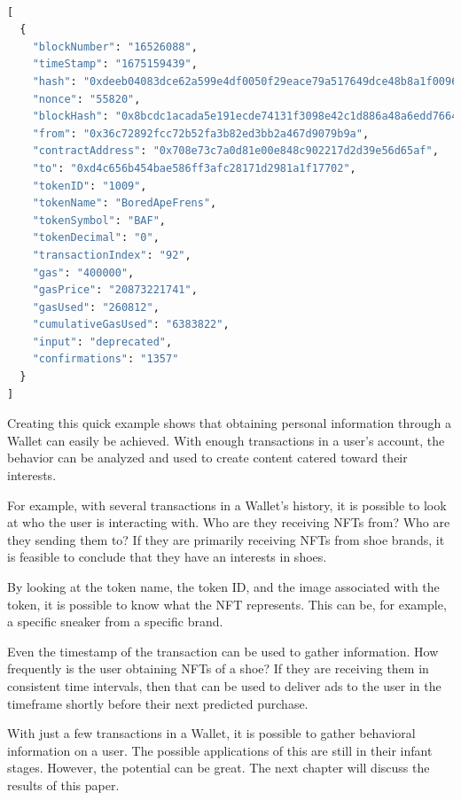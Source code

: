 \begin{center}
\begin{lstlisting}[label=lst:apiResult ,language=python, caption={A real-world example of the response to the API request from listing \ref{lst:apiCall}. The result contains a variety of information, such as the transaction timestamp, the sender's public address (from), and the receivers public address (to). The response is provided by the \textit{Etherscan} API \cite{etherscan}.}, captionpos=b]

[
  {
    "blockNumber": "16526088",
    "timeStamp": "1675159439",
    "hash": "0xdeeb04083dce62a599e4df0050f29eace79a517649dce48b8a1f00961f39742c",
    "nonce": "55820",
    "blockHash": "0x8bcdc1acada5e191ecde74131f3098e42c1d886a48a6edd766425c725d976455",
    "from": "0x36c72892fcc72b52fa3b82ed3bb2a467d9079b9a",
    "contractAddress": "0x708e73c7a0d81e00e848c902217d2d39e56d65af",
    "to": "0xd4c656b454bae586ff3afc28171d2981a1f17702",
    "tokenID": "1009",
    "tokenName": "BoredApeFrens",
    "tokenSymbol": "BAF",
    "tokenDecimal": "0",
    "transactionIndex": "92",
    "gas": "400000",
    "gasPrice": "20873221741",
    "gasUsed": "260812",
    "cumulativeGasUsed": "6383822",
    "input": "deprecated",
    "confirmations": "1357"
  }
]
\end{lstlisting}
\end{center}

Creating this quick example shows that obtaining personal information through a Wallet can easily be achieved. With enough transactions in a user's account, the behavior can be analyzed and used to create content catered toward their interests.

For example, with several transactions in a Wallet's history, it is possible to look at who the user is interacting with. Who are they receiving NFTs from? Who are they sending them to? If they are primarily receiving NFTs from shoe brands, it is feasible to conclude that they have an interests in shoes.

By looking at the token name, the token ID, and the image associated with the token, it is possible to know what the NFT represents. This can be, for example, a specific sneaker from a specific brand.

Even the timestamp of the transaction can be used to gather information. How frequently is the user obtaining NFTs of a shoe? If they are receiving them in consistent time intervals, then that can be used to deliver ads to the user in the timeframe shortly before their next predicted purchase.

With just a few transactions in a Wallet, it is possible to gather behavioral information on a user. The possible applications of this are still in their infant stages. However, the potential can be great. The next chapter will discuss the results of this paper.